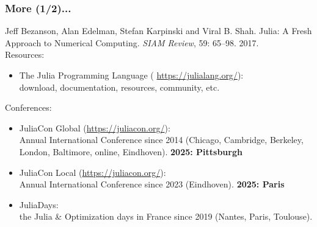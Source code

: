 \documentclass[]{beamer}
\newcommand*{\blue}[1]{\textcolor{nblue}{#1}}
\begin{document}
% 
%

\begin{frame}
  \frametitle{More (1/2)...}
\vspace{3mm}

{\footnotesize

Jeff Bezanson, Alan Edelman, Stefan Karpinski and Viral B. Shah.
Julia: A Fresh Approach to Numerical Computing. 
\textit{SIAM Review}, 59: 65--98. 2017.\vspace{5mm}\\

Resources:\\
\begin{itemize}
\item[] \blue{The Julia Programming Language} ( \url{https://julialang.org/}): \\
download, documentation, resources, community, etc. \vspace{4mm}
\end{itemize}

Conferences:\\
\begin{itemize}
\item[] \blue{JuliaCon Global} (\url{https://juliacon.org/}):\\ Annual International Conference since 2014 (Chicago, Cambridge, Berkeley, London, Baltimore, online, Eindhoven). \textbf{2025: Pittsburgh} \vspace{1.5mm}

\item[] \blue{JuliaCon Local} (\url{https://juliacon.org/}):\\ Annual International Conference since 2023 (Eindhoven). \textbf{2025: Paris} \vspace{1.5mm}\\

\item[] \blue{JuliaDays}:\\ the Julia \& Optimization days in France since 2019 (Nantes, Paris, Toulouse).
\end{itemize}

}
\end{frame}

% 
%
\end{document}
